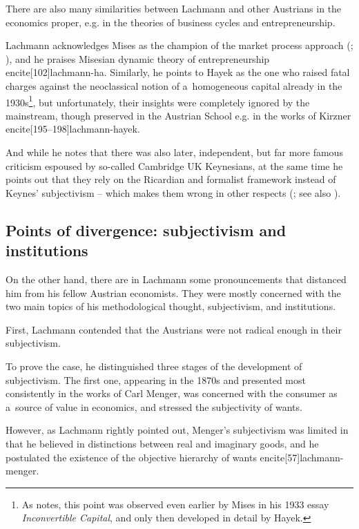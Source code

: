 {There are also many similarities between Lachmann and other Austrians in the economics proper, e.g. in the theories of business cycles and entrepreneurship.

Lachmann acknowledges Mises as the champion of the market process approach (\cite[182--183]{lachmann-mises-process}; \citeyear[60]{lachmann-kaleidic}), and he praises Misesian dynamic theory of entrepreneurship encite[102]{lachmann-ha}. Similarly, he points to Hayek as the one who raised fatal charges against the neoclassical notion of a~homogeneous capital already in the 1930s\footnote{As \textcite[lxii-lxiii]{hulsmann} notes, this point was observed even earlier by Mises in his 1933 essay \emph{Inconvertible Capital}, and only then developed in detail by Hayek.}, but unfortunately, their insights were completely ignored by the mainstream, though preserved in the Austrian School e.g. in the works of Kirzner encite[195--198]{lachmann-hayek}.

And while he notes that there was also later, independent, but far more famous criticism espoused by so-called Cambridge UK Keynesians, at the same time he points out that they rely on the Ricardian and formalist framework instead of Keynes' subjectivism -- which makes them wrong in other respects (\cite[21, 51--52]{lachmann1973macro}; see also \cite[33]{lachmann-crisis}).



\subsection{Points of divergence: subjectivism and institutions}





On the other hand, there are in Lachmann some pronouncements that distanced him from his fellow Austrian economists. They were mostly concerned with the two main topics of his methodological thought, subjectivism, and institutions.



First, Lachmann contended that the Austrians were not radical enough in their subjectivism.

To prove the case, he distinguished three stages of the development of subjectivism. The first one, appearing in the 1870s and presented most consistently in the works of Carl Menger, was concerned with the consumer as a~source of value in economics, and stressed the subjectivity of wants.

However, as Lachmann rightly pointed out, Menger's subjectivism was limited in that he believed in distinctions between real and imaginary goods, and he postulated the existence of the objective hierarchy of wants encite[57]{lachmann-menger}.



}
